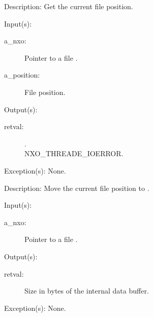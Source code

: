 \begin{capi}
\begin{capilist}
	\item[Description: ]
		Get the current file position.
	\end{capilist}
\label{nxo_file_position_set}
	\begin{capilist}
	\item[Input(s): ]
		\begin{description}\item[]
		\item[a\_nxo: ]
			Pointer to a file .
		\item[a\_position: ]
			File position.
		\end{description}
	\item[Output(s): ]
		\begin{description}\item[]
		\item[retval: ]
			\begin{description}\item[]
			\item[.]
			\item[
				{NXO_THREADE_IOERROR}.]
			\end{description}
		\end{description}
	\item[Exception(s): ] None.
	\item[Description: ]
		Move the current file position to .
	\end{capilist}
\label{nxo_file_buffer_size_get}
	\begin{capilist}
	\item[Input(s): ]
		\begin{description}\item[]
		\item[a\_nxo: ]
			Pointer to a file \classname{nxo}.
		\end{description}
	\item[Output(s): ]
		\begin{description}\item[]
		\item[retval: ]
			Size in bytes of the internal data buffer.
		\end{description}
	\item[Exception(s): ] None.

\end{capilist}
\end{capi}
